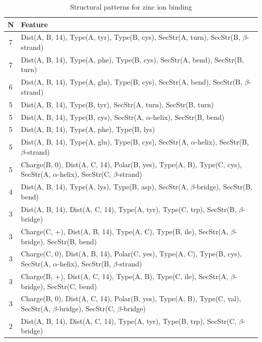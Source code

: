 \documentclass[11pt,twoside,a4paper]{book}
\begin{document}
\begin{table}\begin{tabularx}{\textwidth}{cX}\textbf{N} & \textbf{Feature} \\ \hline  
7 & Dist(A, B, 14),  Type(A, tyr), Type(B, cys), SecStr(A, turn), SecStr(B, $\beta$-strand)\\ \hline 
7 & Dist(A, B, 14),  Type(A, phe), Type(B, cys), SecStr(A, bend), SecStr(B, turn)\\ \hline 
6 & Dist(A, B, 14),  Type(A, gln), Type(B, cys), SecStr(A, bend), SecStr(B, $\beta$-strand)\\ \hline 
5 & Dist(A, B, 14),  Type(B, tyr), SecStr(A, turn), SecStr(B, turn)\\ \hline 
5 & Dist(A, B, 14),  Type(B, cys), SecStr(A, $\alpha$-helix), SecStr(B, bend)\\ \hline 
5 & Dist(A, B, 14),  Type(A, phe), Type(B, lys)\\ \hline 
5 & Dist(A, B, 14),  Type(A, glu), Type(B, cys), SecStr(A, $\alpha$-helix), SecStr(B, $\beta$-strand)\\ \hline 
5 & Charge(B, 0), Dist(A, C, 14), Polar(B, yes),  Type(A, B), Type(C, cys), \newline SecStr(A, $\alpha$-helix), SecStr(C, $\beta$-strand)\\ \hline 
4 & Dist(A, B, 14),  Type(A, lys), Type(B, asp), SecStr(A, $\beta$-bridge), SecStr(B, bend)\\ \hline 
3 & Dist(A, B, 14), Dist(A, C, 14),  Type(A, tyr), Type(C, trp), SecStr(B, $\beta$-bridge)\\ \hline 
3 & Charge(C, +), Dist(A, B, 14),  Type(A, C), Type(B, ile), SecStr(A, $\beta$-bridge), \newline SecStr(B, bend)\\ \hline 
3 & Charge(C, 0), Dist(A, B, 14), Polar(C, yes),  Type(A, C), Type(B, cys), \newline SecStr(A, $\alpha$-helix), SecStr(B, $\beta$-strand)\\ \hline 
3 & Charge(B, +), Dist(A, C, 14),  Type(A, B), Type(C, ile), SecStr(A, $\beta$-bridge), \newline SecStr(C, bend)\\ \hline 
3 & Charge(B, 0), Dist(A, C, 14), Polar(B, yes),  Type(A, B), Type(C, val), \newline SecStr(A, $\beta$-bridge), SecStr(C, $\beta$-bridge)\\ \hline 
2 & Dist(A, B, 14), Dist(A, C, 14),  Type(A, tyr), Type(B, trp), SecStr(C, $\beta$-bridge)\\ \hline 
 \end{tabularx}\caption{Structural patterns for zinc ion binding}\label{tab:zinc_ion_binding}\end{table}
\end{document}
